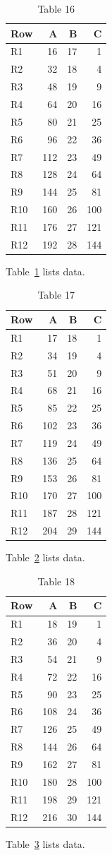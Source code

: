 \documentclass[10pt]{article}
\begin{document}
\begin{table}[ht]\centering\caption{Table 16}\label{tab:16}\begin{tabular}{lrrr}\toprule Row&A&B&C\\\midrule
R1&16&17&1\\
R2&32&18&4\\
R3&48&19&9\\
R4&64&20&16\\
R5&80&21&25\\
R6&96&22&36\\
R7&112&23&49\\
R8&128&24&64\\
R9&144&25&81\\
R10&160&26&100\\
R11&176&27&121\\
R12&192&28&144\\
\bottomrule\end{tabular}\end{table} Table~\ref{tab:16} lists data.
\begin{table}[ht]\centering\caption{Table 17}\label{tab:17}\begin{tabular}{lrrr}\toprule Row&A&B&C\\\midrule
R1&17&18&1\\
R2&34&19&4\\
R3&51&20&9\\
R4&68&21&16\\
R5&85&22&25\\
R6&102&23&36\\
R7&119&24&49\\
R8&136&25&64\\
R9&153&26&81\\
R10&170&27&100\\
R11&187&28&121\\
R12&204&29&144\\
\bottomrule\end{tabular}\end{table} Table~\ref{tab:17} lists data.
\begin{table}[ht]\centering\caption{Table 18}\label{tab:18}\begin{tabular}{lrrr}\toprule Row&A&B&C\\\midrule
R1&18&19&1\\
R2&36&20&4\\
R3&54&21&9\\
R4&72&22&16\\
R5&90&23&25\\
R6&108&24&36\\
R7&126&25&49\\
R8&144&26&64\\
R9&162&27&81\\
R10&180&28&100\\
R11&198&29&121\\
R12&216&30&144\\
\bottomrule\end{tabular}\end{table}\clearpage Table~\ref{tab:18} lists data.
\end{document}
